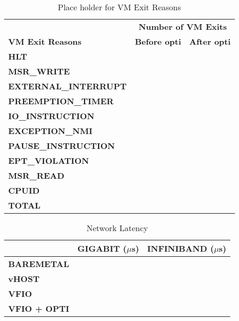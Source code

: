 

\begin{table}
\begin{tabular}{|p{4cm}|p{1.8cm}|p{1.8cm}|} \hline
 & \multicolumn{2}{|c|}{\textbf{Number of VM Exits}} \\ \cline{2-3} 
\textbf{VM Exit Reasons}& \textbf{Before \linebreak opti} & \textbf{After \linebreak opti}\\ %
\textbf{HLT} & &\\ \hline
\textbf{MSR\_WRITE} & &\\ \hline
\textbf{EXTERNAL\_INTERRUPT} & &\\ \hline
\textbf{PREEMPTION\_TIMER} & &\\ \hline
\textbf{IO\_INSTRUCTION} & &\\ \hline
\textbf{EXCEPTION\_NMI} & &\\ \hline
\textbf{PAUSE\_INSTRUCTION} & &\\ \hline
\textbf{EPT\_VIOLATION} & &\\ \hline
\textbf{MSR\_READ} & &\\ \hline
\textbf{CPUID} & &\\ \hline
\textbf{TOTAL} &  &\\ \hline
\end{tabular}
\vspace{6pt}
\caption{Place holder for VM Exit Reasons}
\label{tab:vm_exit_reasons}
\end{table}

\begin{table}
\begin{tabular}{|l|p{2cm}|p{2cm}|}
\hline
\textbf{} & \textbf{GIGABIT ($\mu$s)} & \textbf{INFINIBAND ($\mu$s)} \\ \hline
\textbf{BAREMETAL} & & \\ \hline
\textbf{vHOST} & & \\ \hline
\textbf{VFIO} & & \\ \hline
\textbf{VFIO + OPTI} & & \\
\hline
\end{tabular}
\caption{Network Latency}
\label{tab:network_latency}
\end{table}

